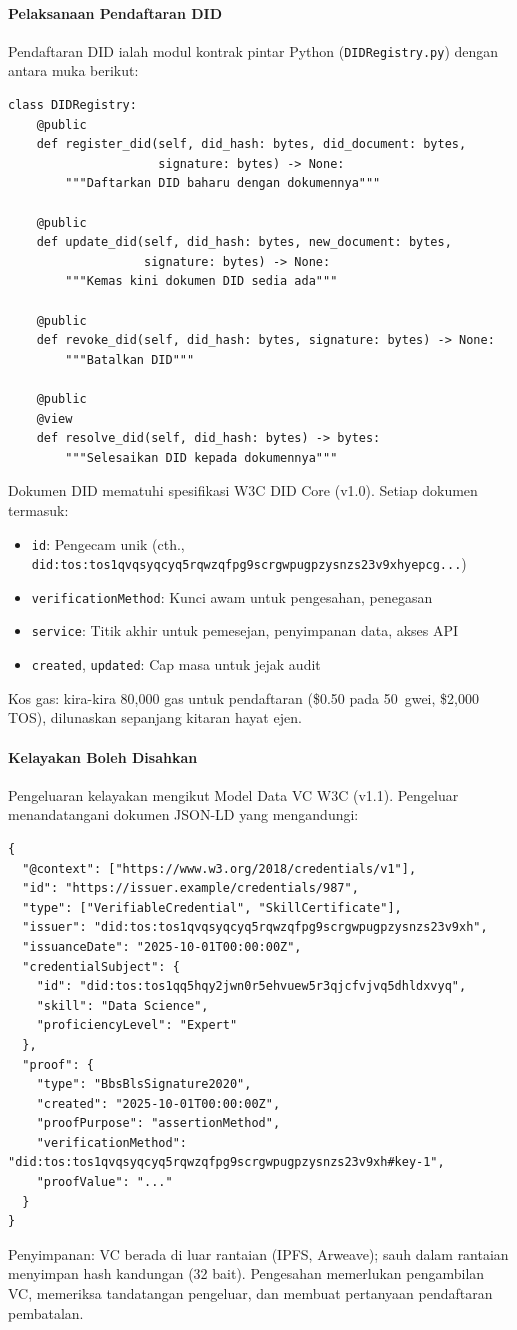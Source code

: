\documentclass[11pt]{article}
\begin{document}
\paragraph{Pelaksanaan Pendaftaran DID} Pendaftaran DID ialah modul kontrak pintar Python (\texttt{DIDRegistry.py}) dengan antara muka berikut:
\begin{verbatim}
class DIDRegistry:
    @public
    def register_did(self, did_hash: bytes, did_document: bytes,
                     signature: bytes) -> None:
        """Daftarkan DID baharu dengan dokumennya"""

    @public
    def update_did(self, did_hash: bytes, new_document: bytes,
                   signature: bytes) -> None:
        """Kemas kini dokumen DID sedia ada"""

    @public
    def revoke_did(self, did_hash: bytes, signature: bytes) -> None:
        """Batalkan DID"""

    @public
    @view
    def resolve_did(self, did_hash: bytes) -> bytes:
        """Selesaikan DID kepada dokumennya"""
\end{verbatim}
Dokumen DID mematuhi spesifikasi W3C DID Core (v1.0). Setiap dokumen termasuk:
\begin{itemize}[noitemsep]
  \item \texttt{id}: Pengecam unik (cth., \texttt{did:tos:tos1qvqsyqcyq5rqwzqfpg9scrgwpugpzysnzs23v9xhyepcg...})
  \item \texttt{verificationMethod}: Kunci awam untuk pengesahan, penegasan
  \item \texttt{service}: Titik akhir untuk pemesejan, penyimpanan data, akses API
  \item \texttt{created}, \texttt{updated}: Cap masa untuk jejak audit
\end{itemize}
Kos gas: kira-kira 80,000 gas untuk pendaftaran (\$0.50 pada 50~gwei, \$2,000 TOS), dilunaskan sepanjang kitaran hayat ejen.

\paragraph{Kelayakan Boleh Disahkan} Pengeluaran kelayakan mengikut Model Data VC W3C (v1.1). Pengeluar menandatangani dokumen JSON-LD yang mengandungi:
\begin{verbatim}
{
  "@context": ["https://www.w3.org/2018/credentials/v1"],
  "id": "https://issuer.example/credentials/987",
  "type": ["VerifiableCredential", "SkillCertificate"],
  "issuer": "did:tos:tos1qvqsyqcyq5rqwzqfpg9scrgwpugpzysnzs23v9xh",
  "issuanceDate": "2025-10-01T00:00:00Z",
  "credentialSubject": {
    "id": "did:tos:tos1qq5hqy2jwn0r5ehvuew5r3qjcfvjvq5dhldxvyq",
    "skill": "Data Science",
    "proficiencyLevel": "Expert"
  },
  "proof": {
    "type": "BbsBlsSignature2020",
    "created": "2025-10-01T00:00:00Z",
    "proofPurpose": "assertionMethod",
    "verificationMethod": "did:tos:tos1qvqsyqcyq5rqwzqfpg9scrgwpugpzysnzs23v9xh#key-1",
    "proofValue": "..."
  }
}
\end{verbatim}
Penyimpanan: VC berada di luar rantaian (IPFS, Arweave); sauh dalam rantaian menyimpan hash kandungan (32 bait). Pengesahan memerlukan pengambilan VC, memeriksa tandatangan pengeluar, dan membuat pertanyaan pendaftaran pembatalan.
\end{document}
